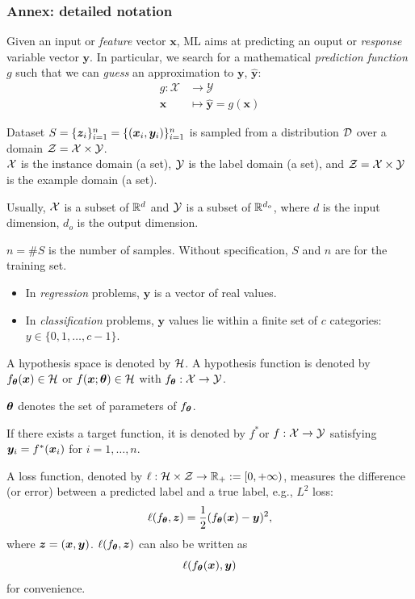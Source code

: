 \documentclass{beamer}
\begin{document}
\begin{frame}[allowframebreaks]
  \frametitle{Annex: detailed notation}

  Given an input or {\em feature} vector $\bm{x}$, ML aims at predicting an ouput or {\em response} variable vector $\bm{y}$. In particular, we search for a mathematical {\em prediction function} $g$ such that we can {\em guess} an approximation to $\bm{y}$, $\hat{\bm{y}}$:
  \begin{align*}
      g \colon \mathcal{X}  & \rightarrow \mathcal{Y}\\
      \bm{x}                &\mapsto \hat{\bm{y}}=g(\bm{x})
  \end{align*}

  \begin{definition}
    Dataset  $S=\{\bm{z}_i\}_{i=1}^n=\{(\bm{x}_i,\bm{y}_i)\}_{i=1}^n$ is sampled from a distribution $\mathcal{D}$ over a domain $\mathcal{Z}=\mathcal{X}\times\mathcal{Y}$.\\
    $\mathcal{X}$  is the instance domain (a set), $\mathcal{Y}$ is the label domain (a set), and $\mathcal{Z}=\mathcal{X}\times\mathcal{Y}$ is the example domain (a set).
  \end{definition}
  
  Usually,
  $\mathcal{X}$ is a subset of $\mathbb{R}^d$ and $\mathcal{Y}$ is a subset of $\mathbb{R}^{d_{o}}$, where $d$ is the input dimension, $d_{o}$ is the output dimension.
  
  $n=\#S$ is the number of samples. Without specification, $S$ and $n$ are for the training set.

  \begin{itemize}
    \item In {\em regression} problems, $\bm{y}$ is a vector of real values.
    \item In {\em classification} problems, $\bm{y}$ values lie within a finite set of $c$ categories: $y\in\{0, 1, \ldots, c-1\}$.
  \end{itemize}

  \begin{definition}  
  A hypothesis space is denoted by $\mathcal{H}$. A hypothesis function is denoted by $f_{\bm{\theta}}(\bm{x})\in\mathcal{H}$ or $f(\bm{x};\bm{\theta})\in\mathcal{H}$ with $f_{\bm{\theta}}:\mathcal{X}\to\mathcal{Y}$.
  \end{definition}
  
  $\bm{\theta}$  denotes the set of parameters of $f_{\bm{\theta}}$.
  
  If there exists a target function, it is denoted by $f^*$or $f:\mathcal{X}\to\mathcal{Y}$ satisfying $\bm{y}_i=f^*(\bm{x}_i)$ for $i=1,\ldots,n$.
  
  A loss function, denoted by $\ell:\mathcal{H}\times\mathcal{Z}\to\mathbb{R}_+:=[0,+\infty)$, measures the difference (or error) between a predicted label and a true label, e.g., $L^2$ loss:
  \[
      \ell(f_{\bm{\theta}},\bm{z})=\frac{1}{2}(f_{\bm{\theta}}(\bm{x})-\bm{y})^2,
  \]
  where $\bm{z}=(\bm{x},\bm{y})$. $\ell(f_{\bm{\theta}},\bm{z})$ can also be written as
  \[
      \ell(f_{\bm{\theta}}(\bm{x}),\bm{y})
  \]
  for convenience.
  

\end{frame}
\end{document}
